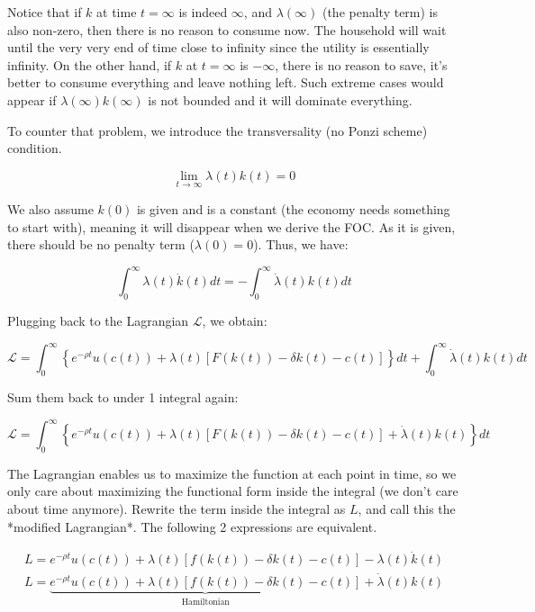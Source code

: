 \documentclass[11pt,a4paper]{book}
\theoremstyle{definition}\newtheorem{definition}{Definition}
\theoremstyle{definition}\newtheorem{fact}{Fact}
\theoremstyle{definition}\newtheorem{remark}{Remark}
\theoremstyle{definition}\newtheorem{ex}{Ex.}
\theoremstyle{definition}\newtheorem{project}{Project}
\theoremstyle{definition}\newtheorem{problem}{Problem}
\theoremstyle{definition}\newtheorem{example}{Example}
\numberwithin{theorem}{section}
\numberwithin{corollary}{chapter}
\numberwithin{assumption}{chapter}
\numberwithin{definition}{chapter}
\numberwithin{prop}{chapter}
\numberwithin{notation}{chapter}
\numberwithin{problem}{chapter}
\numberwithin{example}{chapter}
\numberwithin{fact}{chapter}
\numberwithin{ex}{chapter}
\begin{document}
Notice that if $k$ at time $t=\infty$ is indeed $\infty$, and $\lambda(\infty)$ (the penalty term) is also non-zero, then there is no reason to consume now. The household will wait until the very very end of time close to infinity since the utility is essentially infinity. On the other hand, if $k$ at $t=\infty$ is $-\infty$, there is no reason to save, it's better to consume everything and leave nothing left. Such extreme cases would appear if $\lambda(\infty)k(\infty)$ is not bounded and it will dominate everything.

To counter that problem, we introduce the transversality (no Ponzi scheme) condition.

$$
    \lim_{t\to\infty} \lambda(t)k(t) = 0
$$

We also assume $k(0)$ is given and is a constant (the economy needs something to start with), meaning it will disappear when we derive the FOC. As it is given, there should be no penalty term ($\lambda(0) = 0$). Thus, we have:

$$
    \int_{0}^{\infty} \lambda(t)\dot{k}(t) dt = - \int_{0}^{\infty} \dot{\lambda}(t) k(t) dt
$$

Plugging back to the Lagrangian $\mathcal{L}$, we obtain:

$$
    \mathcal{L} = \int_{0}^{\infty} \left\{ e^{-\rho t} u(c(t)) + \lambda(t) \left[ F( k(t)) - \delta k(t) - c(t)  \right] \right\} dt + \int_{0}^{\infty} \dot{\lambda}(t)k(t)dt 
$$

Sum them back to under 1 integral again:

$$
    \mathcal{L} = \int_{0}^{\infty} \left\{ e^{-\rho t} u(c(t)) + \lambda(t) \left[ F( k(t)) - \delta k(t) - c(t)  \right] +  \dot{\lambda}(t)k(t) \right\} dt 
$$

The Lagrangian enables us to maximize the function at each point in time, so we only care about maximizing the functional form inside the integral (we don't care about time anymore). Rewrite the term inside the integral as $L$, and call this the *modified Lagrangian*. The following 2 expressions are equivalent.

\begin{align}
     L = {e^{-\rho t} u(c(t)) + \lambda(t) \left[ f( k(t)) - \delta k(t) - c(t)  \right]} -  \lambda(t)\dot{k}(t)     \label{eq:foc_c2} \\                            
     L =  \underbrace{e^{-\rho t} u(c(t)) + \lambda(t) \left[ f( k(t)) - \delta k(t) - c(t)  \right]}_{\text{Hamiltonian}}+  \dot{\lambda}(t)k(t)  \label{eq:foc_k2}
\end{align}
\end{document}
